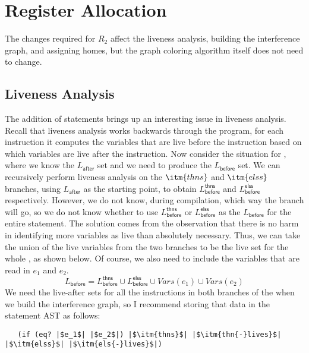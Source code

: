 \documentclass[11pt]{book}
\begin{document}
\section{Register Allocation}
\label{sec:register-allocation-r2}

The changes required for $R_2$ affect the liveness analysis, building
the interference graph, and assigning homes, but the graph coloring
algorithm itself does not need to change.

\subsection{Liveness Analysis}
\label{sec:liveness-analysis-r2}

The addition of  statements brings up an interesting issue in
liveness analysis. Recall that liveness analysis works backwards
through the program, for each instruction it computes the variables
that are live before the instruction based on which variables are live
after the instruction. Now consider the situation for , where we know
the $L_{\mathsf{after}}$ set and we need to produce the
$L_{\mathsf{before}}$ set.  We can recursively perform liveness
analysis on the $\itm{thns}$ and $\itm{elss}$ branches, using
$L_{\mathsf{after}}$ as the starting point, to obtain
$L^{\mathsf{thns}}_{\mathsf{before}}$ and
$L^{\mathsf{elss}}_{\mathsf{before}}$ respectively. However, we do not
know, during compilation, which way the branch will go, so we do not
know whether to use $L^{\mathsf{thns}}_{\mathsf{before}}$ or
$L^{\mathsf{elss}}_{\mathsf{before}}$ as the $L_{\mathsf{before}}$ for
the entire  statement. The solution comes from the observation
that there is no harm in identifying more variables as live than
absolutely necessary. Thus, we can take the union of the live
variables from the two branches to be the live set for the whole
, as shown below. Of course, we also need to include the
variables that are read in $e_1$ and $e_2$.
\[
  L_{\mathsf{before}} = L^{\mathsf{thns}}_{\mathsf{before}} \cup
  L^{\mathsf{elss}}_{\mathsf{before}} \cup
  \mathit{Vars}(e_1) \cup \mathit{Vars}(e_2)
\]
We need the live-after sets for all the instructions in both branches
of the  when we build the interference graph, so I recommend
storing that data in the  statement AST as follows:
\begin{lstlisting}
   (if (eq? |$e_1$| |$e_2$|) |$\itm{thns}$| |$\itm{thn{-}lives}$| |$\itm{elss}$| |$\itm{els{-}lives}$|)
\end{lstlisting}
\end{document}
